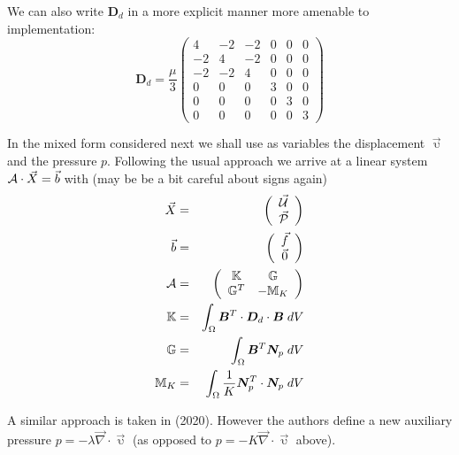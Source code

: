 We can also write ${\bm D}_d$ in a more explicit manner more amenable to 
implementation:
\begin{equation}
{\bm D}_d 
=
\frac{\mu}{3}
\left(
\begin{array}{cccccc}
4 & -2 & -2 & 0 & 0 & 0 \\
-2 & 4 & -2 & 0 & 0 & 0 \\
-2 & -2 & 4 & 0 & 0 & 0 \\
0 & 0 & 0 & 3 & 0 & 0 \\ 
0 & 0 & 0 & 0 & 3 & 0 \\ 
0 & 0 & 0 & 0 & 0 & 3
\end{array}
\right) 
\end{equation}

In the mixed form considered next we shall use as variables 
the displacement $\vec{\upupsilon}$ and the pressure $p$.
Following the usual approach we arrive at a linear system 
${\cal A}\cdot \vec{X} = \vec{b}$ with (may be be a bit careful about signs again)
\begin{eqnarray}
\vec{X} 
&=& \left(\begin{array}{c} \vec{\cal U} \\ \vec{\cal P} \end{array} \right) \nonumber\\
\vec{b} &=& \left(\begin{array}{c} \vec{f} \\ \vec{0} \end{array} \right) \nonumber\\
{\cal A} &=& 
\left(\begin{array}{cc} {\mathbb{K}} & {\mathbb{G}} \\ {\mathbb{G}}^T & -{\mathbb{M}}_K \end{array} \right) \nonumber\\
{\mathbb{K}} &=& \int_\Omega {\bm B}^T \cdot {\bm D}_d \cdot {\bm B} \; dV \nonumber\\
{\mathbb{G}} &=& \int_\Omega {\bm B}^T {\bm N}_p \; dV \nonumber\\
{\mathbb{M}}_K &=& \int_\Omega \frac{1}{K}{\bm N}^T_p \cdot {\bm N}_p \; dV \nonumber
\end{eqnarray}

\begin{remark}
A similar approach is taken in \textcite{samb20} (2020). 
However the authors define a new auxiliary pressure 
$p=-\lambda \vec\nabla\cdot\vec{\upupsilon}$ (as opposed to $p=-K \vec\nabla\cdot\vec{\upupsilon}$ above). 
\end{remark}




